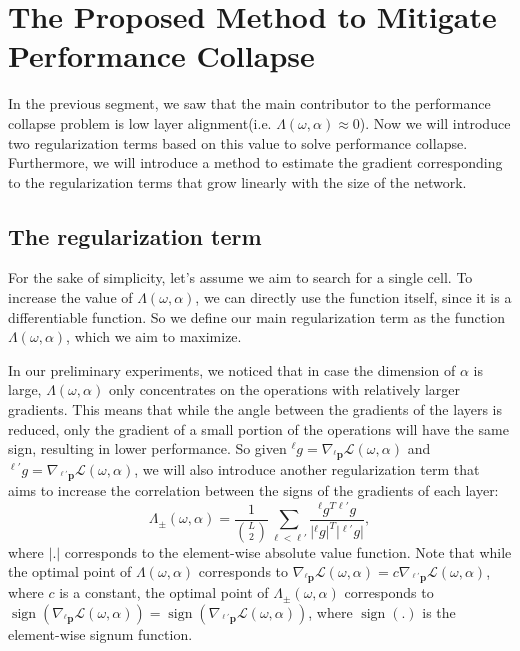 \documentclass{article} \usepackage{fancyhdr, iclr2023_conference, times}
\def\vp{{\bm{p}}}
\DeclareMathOperator{\sign}{sign}
\newcommand{\lambdafn}{layer alignment\xspace}
\begin{document}
\section{The Proposed Method to Mitigate Performance Collapse}
In the previous segment, we saw that the main contributor to the performance collapse problem is low \lambdafn (i.e. $\Lambda(\omega, \alpha)\approx 0$). Now we will introduce two regularization terms based on this value to solve performance collapse. Furthermore, we will introduce a method to estimate the gradient corresponding to the regularization terms that grow linearly with the size of the network.
\subsection{The regularization term}
For the sake of simplicity, let's assume we aim to search for a single cell. To increase the value of $\Lambda(\omega, \alpha)$, we can directly use the function itself, since it is a differentiable function. So we define our main regularization term as the function $\Lambda(\omega, \alpha)$, which we aim to maximize.
\par In our preliminary experiments, we noticed that in case the dimension of $\alpha$ is large, $\Lambda(\omega, \alpha)$ only concentrates on the operations with relatively larger gradients. This means that while the angle between the gradients of the layers is reduced, only the gradient of a small portion of the operations will have the same sign, resulting in lower performance. So given ${}^\ell g=\nabla_{{}^\ell \vp}\mathcal{L}(\omega, \alpha)$ and ${}^{\ell'}g=\nabla_{{}^{\ell'} \vp}\mathcal{L}(\omega, \alpha)$, we will also introduce another regularization term that aims to increase the correlation between the signs of the gradients of each layer:
\begin{equation}
    \Lambda_\pm (\omega, \alpha)=\frac{1}{\binom{L}{2}} \sum_{\ell<\ell'}\frac{{}^\ell g^T{}^{\ell'}g}{\vert {}^\ell g\vert ^T \vert{}^{\ell'}g\vert},
\end{equation}
where $\vert .\vert$ corresponds to the element-wise absolute value function. Note that while the optimal point of $\Lambda(\omega, \alpha)$ corresponds to $\nabla_{{}^\ell \vp}\mathcal{L}(\omega, \alpha)=c\nabla_{{}^{\ell'} \vp}\mathcal{L}(\omega, \alpha)$, where $c$ is a constant, the optimal point of $\Lambda_{\pm}(\omega, \alpha)$ corresponds to $\sign(\nabla_{{}^\ell \vp}\mathcal{L}(\omega, \alpha))=\sign(\nabla_{{}^{\ell'} \vp}\mathcal{L}(\omega, \alpha))$, where $\sign(.)$ is the element-wise signum function.
\end{document}
